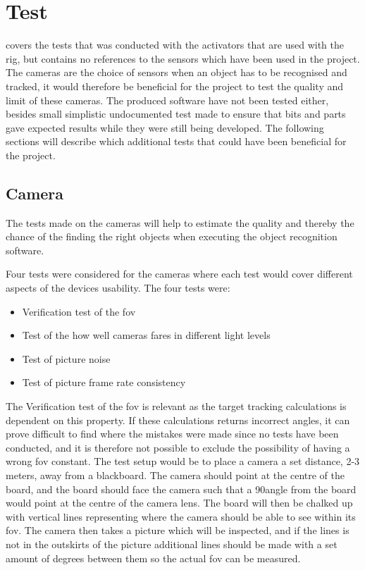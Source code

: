\section{Test}
\label{sec:disc_test}
 covers the tests that was conducted with the activators that are used with the rig, but contains no references to the sensors which have been used in the project. The cameras are the choice of sensors when an object has to be recognised and tracked, it would therefore be beneficial for the project to test the quality and limit of these cameras. The produced software have not been tested either, besides small simplistic undocumented test made to ensure that bits and parts gave expected results while they were still being developed. The following sections will describe which additional tests that could have been beneficial for the project.

\subsection{Camera}\label{subsec:disc_camera}
The tests made on the cameras will help to estimate the quality and thereby the chance of the finding the right objects when executing the object recognition software.

Four tests were considered for the cameras where each test would cover different aspects of the devices usability. The four tests were:
\begin{itemize}
\item Verification test of the \gls{fov}
\item Test of the how well cameras fares in different light levels
\item Test of picture noise
\item Test of picture frame rate consistency
\end{itemize}

The Verification test of the \gls{fov} is relevant as the target tracking calculations is dependent on this property. If these calculations returns incorrect angles, it can prove difficult to find where the mistakes were made since no tests have been conducted, and it is therefore not possible to exclude the possibility of having a wrong \gls{fov} constant. The test setup would be to place a camera a set distance, 2-3 meters, away from a blackboard. The camera should point at the centre of the board, and the board should face the camera such that a 90\degree angle from the board would point at the centre of the camera lens. The board will then be chalked up with vertical lines representing where the camera should be able to see within its \gls{fov}. The camera then takes a picture which will be inspected, and if the lines is not in the outskirts of the picture additional lines should be made with a set amount of degrees between them so the actual \gls{fov} can be measured.

